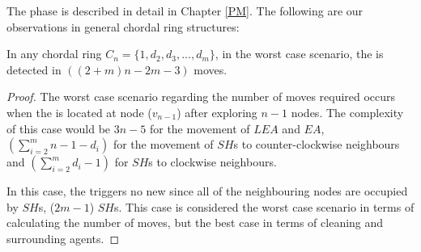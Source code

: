 % 
%
%

 The   phase is  described in detail in Chapter \ref{PM}. The following are our observations in general chordal ring structures:

\begin{theorem}

In any  chordal ring $C_n=\{1,d_2,d_3,...,d_m\}$, in the worst case scenario, the \bv is detected in $((2+m)n-2m-3)$ moves.

\end{theorem}
\begin{proof}
The worst case scenario regarding the number of moves required occurs when the \bv  is located at node ($v_{n-1}$) after exploring   $n-1$ nodes.  
 The complexity of this case would be $3n-5$ for the movement of $LEA$ and $EA$, $(\sum\limits_{i=2}^m n-1-d_i)$ for the movement of $SH$s to counter-clockwise neighbours and $(\sum\limits_{i=2}^m d_i-1)$ for $SH$s to clockwise neighbours. 

 In this case, the \bv triggers no new \bvs since all of the neighbouring nodes are occupied by $SH$s, ($2m-1$) $SH$s. This case is considered the worst case scenario in terms of calculating the number of moves, but the best case in terms of cleaning and surrounding agents.
\end{proof}

